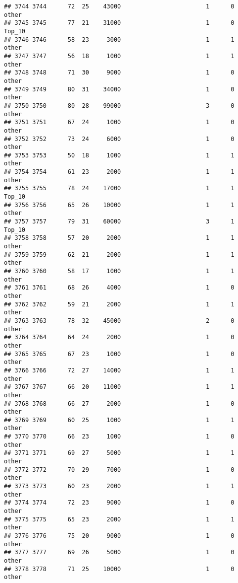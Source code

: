 \documentclass[
]{article}
\begin{document}
\begin{verbatim}
## 3744 3744      72  25    43000                        1      0    other
## 3745 3745      77  21    31000                        1      0   Top_10
## 3746 3746      58  23     3000                        1      1    other
## 3747 3747      56  18     1000                        1      1    other
## 3748 3748      71  30     9000                        1      0    other
## 3749 3749      80  31    34000                        1      0    other
## 3750 3750      80  28    99000                        3      0    other
## 3751 3751      67  24     1000                        1      0    other
## 3752 3752      73  24     6000                        1      0    other
## 3753 3753      50  18     1000                        1      1    other
## 3754 3754      61  23     2000                        1      1    other
## 3755 3755      78  24    17000                        1      1   Top_10
## 3756 3756      65  26    10000                        1      1    other
## 3757 3757      79  31    60000                        3      1   Top_10
## 3758 3758      57  20     2000                        1      1    other
## 3759 3759      62  21     2000                        1      1    other
## 3760 3760      58  17     1000                        1      1    other
## 3761 3761      68  26     4000                        1      0    other
## 3762 3762      59  21     2000                        1      1    other
## 3763 3763      78  32    45000                        2      0    other
## 3764 3764      64  24     2000                        1      0    other
## 3765 3765      67  23     1000                        1      0    other
## 3766 3766      72  27    14000                        1      1    other
## 3767 3767      66  20    11000                        1      1    other
## 3768 3768      66  27     2000                        1      0    other
## 3769 3769      60  25     1000                        1      1    other
## 3770 3770      66  23     1000                        1      0    other
## 3771 3771      69  27     5000                        1      1    other
## 3772 3772      70  29     7000                        1      0    other
## 3773 3773      60  23     2000                        1      1    other
## 3774 3774      72  23     9000                        1      0    other
## 3775 3775      65  23     2000                        1      1    other
## 3776 3776      75  20     9000                        1      0    other
## 3777 3777      69  26     5000                        1      0    other
## 3778 3778      71  25    10000                        1      0    other

\end{verbatim}
\end{document}
